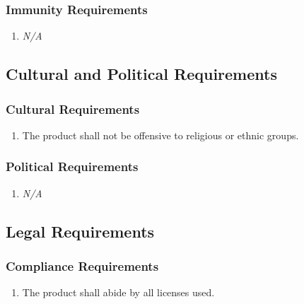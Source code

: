 \documentclass[]{article}
\begin{document}
\subsubsection{Immunity Requirements}
\label{ssub:immunity_requirements}
\begin{enumerate}[{SR}1. ]
	\item \emph{N/A}
\end{enumerate}


\subsection{Cultural and Political Requirements}
\label{sub:cultural_and_political_requirements}

\subsubsection{Cultural Requirements}
\label{ssub:cultural_requirements}
\begin{enumerate}[{CP}1. ]
	\item The product shall not be offensive to religious or ethnic groups.
\end{enumerate}

\subsubsection{Political Requirements}
\label{ssub:political_requirements}
\begin{enumerate}[{SR}1. ]
	\item \emph{N/A}
\end{enumerate}


\subsection{Legal Requirements}
\label{sub:legal_requirements}

\subsubsection{Compliance Requirements}
\label{ssub:compliance_requirements}
\begin{enumerate}[{LR}1. ]
	\item The product shall abide by all licenses used.
\end{enumerate}
\end{document}
